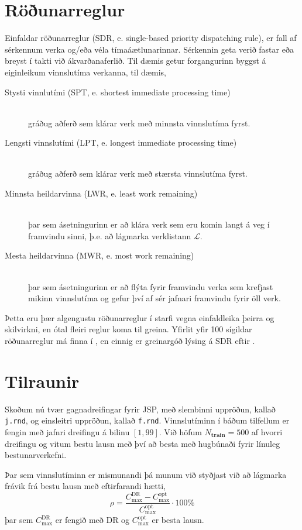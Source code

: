 \documentclass[10pt,a4paper]{article}
\begin{document}
\section*{Röðunarreglur}
Einfaldar röðunarreglur (SDR, e. single-based priority dispatching rule), er 
fall af sérkennum verka og/eða véla tímaáætlunarinnar. Sérkennin geta verið 
fastar eða breyst í takti við ákvarðanaferlið. Til dæmis getur forgangurinn 
byggst á eiginleikum vinnslutíma verkanna, til dæmis, 
\begin{description}
    \item[Stysti vinnlutími (SPT, e. shortest immediate processing time)] 
    \hfill \\ gráðug aðferð sem klárar verk með minnsta vinnslutíma fyrst. 
    \item[Lengsti vinnslutími (LPT, e. longest immediate processing time)] 
    \hfill \\ gráðug aðferð sem klárar verk með stærsta vinnslutíma fyrst. 
    \item[Minnsta heildarvinna (LWR, e. least work remaining)] \hfill \\
    þar sem ásetningurinn er að klára verk sem eru komin langt á veg í 
    framvindu sinni, þ.e. að lágmarka verklistann $\mathcal{L}$.
    \item[Mesta heildarvinna (MWR, e. most work remaining)] \hfill \\
    þar sem ásetningurinn er að flýta fyrir framvindu verka sem krefjast mikinn 
    vinnslutíma og gefur því af sér jafnari framvindu fyrir öll verk.
\end{description}
Þetta eru þær algengustu röðunarreglur í starfi vegna einfaldleika þeirra og 
skilvirkni, en ótal fleiri reglur koma til greina. Yfirlit yfir 100 
sígildar röðunarreglur má finna í \citet{Panwalkar77}, en einnig er greinargóð 
lýsing á SDR eftir \citet{Haupt89}. 

\section*{Tilraunir}
Skoðum nú tvær gagnadreifingar fyrir JSP, með slembinni 
uppröðun, kallað \texttt{j.rnd}, og einsleitri uppröðun, kallað \texttt{f.rnd}. 
Vinnslutíminn í báðum tilfellum er fengin með jafnri dreifingu á bilinu 
$[1,99]$.
Við höfum $N_{\textbf{train}}=500$ af hvorri dreifingu og vitum bestu lausn 
með því að besta með hugbúnaði fyrir línuleg bestunarverkefni. 

Þar sem vinnslutíminn er mismunandi þá munum við styðjast við að lágmarka 
frávik frá bestu lausn með eftirfarandi hætti, 
\begin{equation}
\rho=\frac{C_{\max}^{\text{DR}}-C_{\max}^{\text{opt}}}{C_{\max}^{\text{opt}}}
\cdot 100\%
\end{equation}
þar sem $C_{\max}^{\text{DR}}$ er fengið með DR og $C_{\max}^{\text{opt}}$ er 
besta lausn. 
\end{document}
